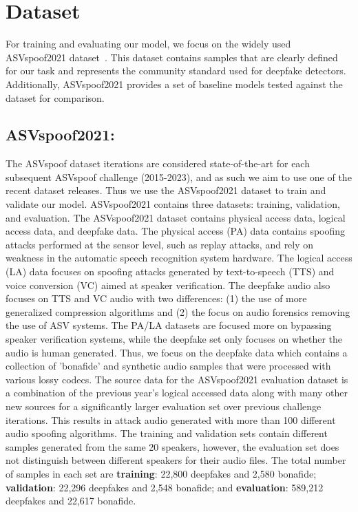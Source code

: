 \documentclass[10pt, journal, anonymous=true]{IEEEtran}
\begin{document}
\section{Dataset} \label{sec:dataset}

For training and evaluating our model, we focus on the widely used ASVspoof2021
dataset~\cite{yamagishi_asvspoof_2021}. This dataset contains samples that are clearly defined 
for our task and represents the community standard used for deepfake detectors. Additionally, ASVspoof2021 provides a set of baseline models tested against the dataset for comparison. 

\subsection{ASVspoof2021:} \label{subsec:meth_dataset_asvspoof} 
The ASVspoof dataset iterations are considered state-of-the-art for each subsequent 
ASVspoof challenge (2015-2023), and as such we aim to use one of the recent dataset releases.
Thus we use the ASVspoof2021 dataset to train and validate our model. ASVspoof2021 contains 
three datasets: training, validation, and evaluation. The ASVspoof2021 dataset contains physical access data, logical access data, and deepfake data. The physical access (PA) data contains spoofing attacks performed at the sensor level, such as replay attacks, and rely on weakness in the automatic speech recognition system hardware. The logical access (LA) data focuses on spoofing attacks generated by text-to-speech (TTS) and voice conversion (VC) aimed at speaker verification. The deepfake audio also focuses on TTS and VC audio with two differences: (1) the use of more generalized compression algorithms and (2) the focus on audio forensics removing the use of ASV systems. The PA/LA datasets are focused more on bypassing speaker verification systems, while the deepfake set only focuses on whether the audio is human generated. Thus, we focus on the deepfake data which contains a collection of 'bonafide' and synthetic audio samples that were processed with various lossy codecs. The source data for the ASVspoof2021 evaluation dataset is a combination of the previous year's logical accessed data along with many other new sources for a significantly larger evaluation set over previous challenge iterations. This results in attack audio generated with more than 100 different audio spoofing algorithms. The training and validation sets contain different samples generated from the same 20 speakers, however, the evaluation set does not distinguish between different speakers for their audio files. The total number of samples in each set are \textbf{training}: 22,800 deepfakes and 2,580 bonafide; \textbf{validation}: 22,296 deepfakes and 2,548 bonafide; and \textbf{evaluation}: 589,212 deepfakes and 22,617 bonafide.  
\end{document}
